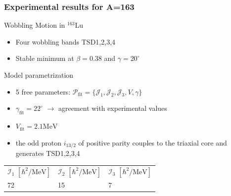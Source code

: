 \documentclass{beamer}
\begin{document}
\begin{frame}
  \frametitle{Experimental results for A=163}
  \begin{exampleblock}{Wobbling Motion in $^{163}$Lu}
    \begin{itemize}
      \item Four wobbling bands TSD1,2,3,4
      \item Stable minimum at $\beta=0.38$ and $\gamma=20^\circ$
    \end{itemize}
    \end{exampleblock}
  \begin{alertblock}{Model parametrization}
    \begin{itemize}
      \item 5 free parameters: $\mathcal{P}_\text{fit}=\{\mathcal{J}_1,\mathcal{J}_2,\mathcal{J}_3,V,\gamma\}$
      \item $\gamma_\text{fit}=22^\circ$ $\rightarrow$ agreement with experimental values
      \item $V_\text{fit}=2.1\text{MeV}$
      \item the odd proton $i_{13/2}$ of positive parity couples to the triaxial core and generates TSD1,2,3,4
    \end{itemize}
  \end{alertblock}
  {\begin{table}
        \centering
      \begin{tabular}{lll}
    $\mathcal{I}_1$ $\left[\hbar^2/\text{MeV}\right]$ & $\mathcal{I}_2$ $\left[\hbar^2/\text{MeV}\right]$ & $\mathcal{I}_3$ $\left[\hbar^2/\text{MeV}\right]$ \\
    {\color{red}72}              & {\color{red}15}              & {\color{red}7}            \\
    \end{tabular}
        \label{parameter_set}
    \end{table}}
\end{frame}
\end{document}
